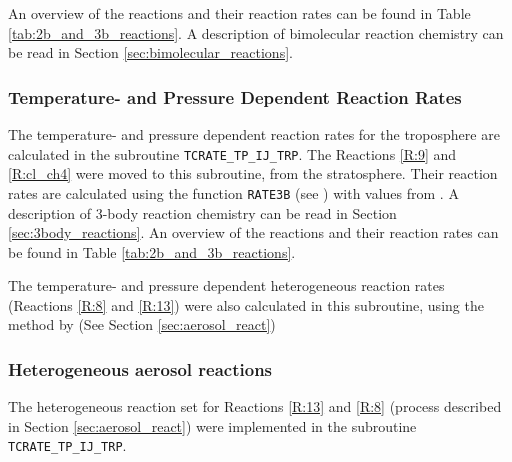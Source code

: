\medskip

An overview of the reactions and their reaction rates can be found in Table \ref{tab:2b_and_3b_reactions}. A description of bimolecular reaction chemistry can be read in Section \ref{sec:bimolecular_reactions}. 

\subsubsection{Temperature- and Pressure Dependent Reaction Rates}\label{sec:temp_press_dependent_react_rates}

The temperature- and pressure dependent reaction rates for the troposphere are calculated in the subroutine \texttt{TCRATE\_TP\_IJ\_TRP}. The Reactions \ref{R:9} and \ref{R:cl_ch4} were moved to this subroutine, from the stratosphere. Their reaction rates are calculated using the function \texttt{RATE3B} (see \cite{SovdeManual}) with values from \cite{JPL}. A description of 3-body reaction chemistry can be read in Section \ref{sec:3body_reactions}. An overview of the reactions and their reaction rates can be found in Table \ref{tab:2b_and_3b_reactions}. 

\medskip

The temperature- and pressure dependent heterogeneous reaction rates (Reactions \ref{R:8} and \ref{R:13}) were also calculated in this subroutine, using the method by \cite{CAO} (See Section \ref{sec:aerosol_react})

\subsubsection{Heterogeneous aerosol reactions}\label{sec:het_aerosol_react_CTM3}

The heterogeneous reaction set for Reactions \ref{R:13} and \ref{R:8} (process described in Section \ref{sec:aerosol_react}) were implemented in the subroutine \texttt{TCRATE\_TP\_IJ\_TRP}. 


